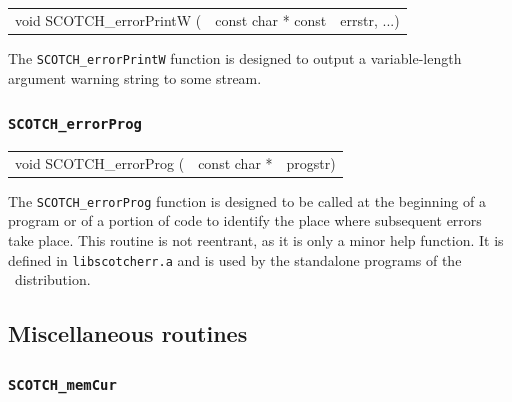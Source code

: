 \begin{itemize}
\progsyn

{\tt\begin{tabular}{l@{}ll}
void SCOTCH\_errorPrintW ( & const char * const & errstr, ...)
\end{tabular}}

\progdes

The {\tt SCOTCH\_errorPrintW} function is designed to output a
variable-length argument warning string to some stream.
\end{itemize}

\subsubsection{{\tt SCOTCH\_errorProg}}

\begin{itemize}
\progsyn

{\tt\begin{tabular}{l@{}ll}
void SCOTCH\_errorProg ( & const char * & progstr)
\end{tabular}}

\progdes

The {\tt SCOTCH\_errorProg} function is designed to be called at
the beginning of a program or of a portion of code to identify the
place where subsequent errors take place.
This routine is not reentrant, as it is only a minor help function. It
is defined in {\tt lib\lbt scotch\lbt err.a} and is used by the
standalone programs of the \scotch\ distribution.
\end{itemize}

\subsection{Miscellaneous routines}
\label{sec-lib-misc}

\subsubsection{{\tt SCOTCH\_memCur}}


